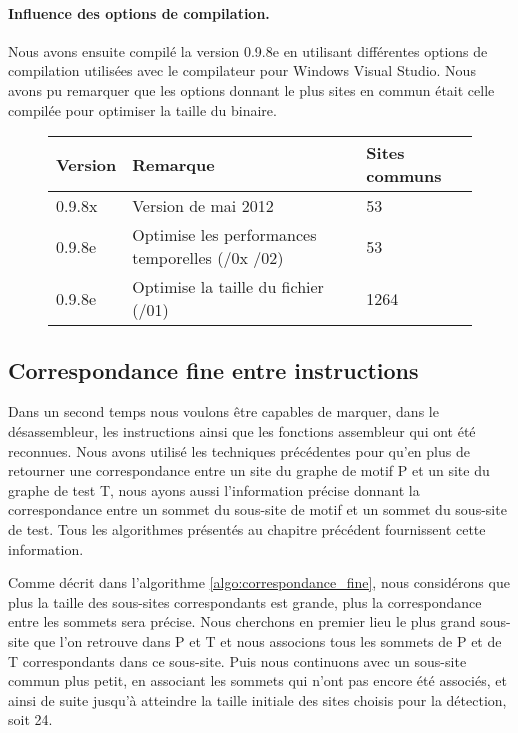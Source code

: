 \paragraph{Influence des options de compilation.}
Nous avons ensuite compilé la version 0.9.8e en utilisant différentes options de compilation utilisées avec le compilateur pour Windows Visual Studio.
Nous avons pu remarquer que les options donnant le plus sites en commun était celle compilée pour optimiser la taille du binaire.

\begin{figure}[h]
\begin{tabular}{|l|l|l|}
 \hline
Version & Remarque & Sites communs \\
 \hline
0.9.8x & Version de mai 2012 & 53 \\
0.9.8e & Optimise les performances temporelles (/0x /02) & 53 \\
0.9.8e & Optimise la taille du fichier (/01) & 1264 \\
 \hline
\end{tabular}
\end{figure}

\subsection{Correspondance fine entre instructions}
Dans un second temps nous voulons être capables de marquer, dans le désassembleur, les instructions ainsi que les fonctions assembleur qui ont été reconnues.
Nous avons utilisé les techniques précédentes pour qu'en plus de retourner une correspondance entre un site du graphe de motif P et un site du graphe de test T, nous ayons aussi l'information précise donnant la correspondance entre un sommet du sous-site de motif et
un sommet du sous-site de test. Tous les algorithmes présentés au chapitre précédent fournissent cette information.

Comme décrit dans l'algorithme \ref{algo:correspondance_fine}, nous considérons que plus la taille des sous-sites correspondants est grande, plus la correspondance entre les sommets sera précise.
Nous cherchons en premier lieu le plus grand sous-site que l'on retrouve dans P et T et nous associons tous les sommets de P et de T  correspondants dans ce sous-site.
Puis nous continuons avec un sous-site commun plus petit, en associant les sommets qui n'ont pas encore été associés, et ainsi de suite jusqu'à atteindre la taille initiale des sites choisis pour la détection, soit 24. 

